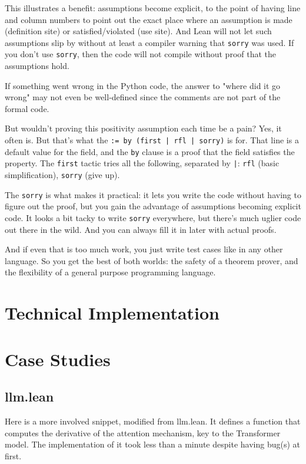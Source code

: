\documentclass{article}
\begin{document}
This illustrates a benefit: assumptions become explicit, to the point of having line and column numbers to point out the exact place where an assumption is made (definition site) or satisfied/violated (use site). And Lean will not let such assumptions slip by without at least a compiler warning that \texttt{sorry} was used. If you don't use \texttt{sorry}, then the code will not compile without proof that the assumptions hold.

If something went wrong in the Python code, the answer to "where did it go wrong" may not even be well-defined since the comments are not part of the formal code.

But wouldn't proving this positivity assumption each time be a pain? Yes, it often is. But that's what the \texttt{:= by (first | rfl | sorry)} is for. That line is a default value for the field, and the \texttt{by} clause is a proof that the field satisfies the property. The \texttt{first} tactic tries all the following, separated by \texttt{|}: \texttt{rfl} (basic simplification), \texttt{sorry} (give up).

The \texttt{sorry} is what makes it practical: it lets you write the code without having to figure out the proof, but you gain the advantage of assumptions becoming explicit code. It looks a bit tacky to write \texttt{sorry} everywhere, but there's much uglier code out there in the wild. And you can always fill it in later with actual proofs.

And if even that is too much work, you just write test cases like in any other language. So you get the best of both worlds: the safety of a theorem prover, and the flexibility of a general purpose programming language.

\section{Technical Implementation}

\section{Case Studies}
\subsection{llm.lean}
Here is a more involved snippet, modified from llm.lean. It defines a function that computes the derivative of the attention mechanism, key to the Transformer model. The implementation of it took less than a minute despite having bug(s) at first.
\end{document}
